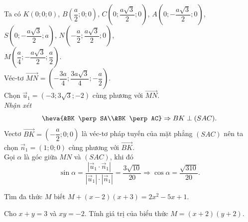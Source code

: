 \begin{bt}
{\begin{center}
		\end{center}
		Ta có 
		$K(0;0;0)$, $B\left(\dfrac{a}{2};0;0\right)$,  $C\left(0;\dfrac{a\sqrt{3}}{2};0\right)$, $A\left(0;-\dfrac{a\sqrt{3}}{2};0\right)$,
		 $S\left(0;-\dfrac{a\sqrt{3}}{2};a\right)$, $N\left(-\dfrac{a}{2};\dfrac{a\sqrt{3}}{2};0\right)$,\\ $M\left(\dfrac{a}{4};-\dfrac{a\sqrt{3}}{2};\dfrac{a}{2}\right)$.\\
		Véc-tơ $\overrightarrow{MN} = \left(-\dfrac{3a}{4}; \dfrac{3a\sqrt{3}}{4}; -\dfrac{a}{2}\right)$.\\ 
		Chọn $\overrightarrow{u}_1 = (-3; 3\sqrt{3}; -2)$ cùng  phương với $\overrightarrow{MN}$.\\
		 \textit{Nhận xét}
		$$\heva{&BK \perp SA\\&BK \perp AC}\Rightarrow BK \perp  (SAC).$$
		Vectơ $\overrightarrow{BK} = \left(-\dfrac{a}{2}; 0; 0\right)$ là véc-tơ pháp tuyến của mặt phẳng  $(SAC)$ nên ta chọn $\overrightarrow{n}_1 = (1;0;0)$ cùng phương với $\overrightarrow{BK}$.\\
		Gọi $\alpha$ là góc giữa $MN$ và $(SAC)$, khi  đó
		$$ 
		\sin\alpha = \dfrac{\left|\overrightarrow{u}_1 \cdot \overrightarrow{n}_1\right|}{\left|\overrightarrow{u}_1\right| \cdot \left|\overrightarrow{n}_1\right|} = \dfrac{3\sqrt{10}}{20} \Rightarrow \cos\alpha =  \dfrac{\sqrt{310}}{20}.
		 $$
	} 
\end{bt}

\begin{bt}%
	Tìm đa thức $M$ biết $M + (x - 2)(x + 3) = 2x^2 - 5x + 1$.
\end{bt}

\begin{bt}%
	Cho $x + y = 3$ và $xy = -2$. Tính giá trị của biểu thức $M = (x + 2)(y + 2)$.
\end{bt}

